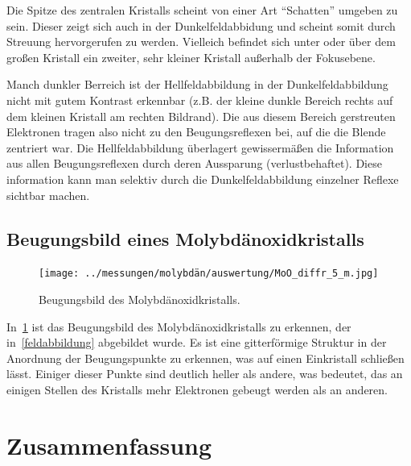 \documentclass[slug=TEM, room=IFW, supervisor=?, coursedate=23.\ 01.\ 2020]{../../Lab_Report_LaTeX/lab_report}
\begin{document}
Die Spitze des zentralen Kristalls scheint von einer Art ``Schatten''
umgeben zu sein. Dieser zeigt sich auch in der Dunkelfeldabbidung und
scheint somit durch Streuung hervorgerufen zu werden. Vielleich
befindet sich unter oder \"uber dem gro\ss{}en Kristall ein zweiter,
sehr kleiner Kristall au\ss{}erhalb der Fokusebene.

Manch dunkler Berreich ist der Hellfeldabbildung in der
Dunkelfeldabbildung nicht mit gutem Kontrast erkennbar (z.B. der
kleine dunkle Bereich rechts auf dem kleinen Kristall am rechten
Bildrand). Die aus diesem Bereich gerstreuten Elektronen tragen also
nicht zu den Beugungsreflexen bei, auf die die Blende zentriert war.
Die Hellfeldabbildung \"uberlagert gewisserm\"a\ss{}en die Information
aus allen Beugungsreflexen durch deren Aussparung
(verlustbehaftet). Diese information kann man selektiv durch die
Dunkelfeldabbildung einzelner Reflexe sichtbar machen.

\subsection{Beugungsbild eines Molybdänoxidkristalls}

\begin{figure}[h]
  \centering
  \texttt{[image: ../messungen/molybdän/auswertung/MoO\_diffr\_5\_m.jpg]}%
  \caption{Beugungsbild des Molybdänoxidkristalls.}
  \label{fig:molbeug}
\end{figure}

In~\ref{fig:molbeug} ist das Beugungsbild des Molybdänoxidkristalls zu erkennen, der
in~\ref{feldabbildung} abgebildet wurde. Es ist eine gitterförmige Struktur in der Anordnung der
Beugungspunkte zu erkennen, was auf einen Einkristall schließen lässt. Einiger dieser Punkte sind
deutlich heller als andere, was bedeutet, das an einigen Stellen des Kristalls mehr Elektronen
gebeugt werden als an anderen.

\section{Zusammenfassung}
\label{sec:zusfassung}
\end{document}
